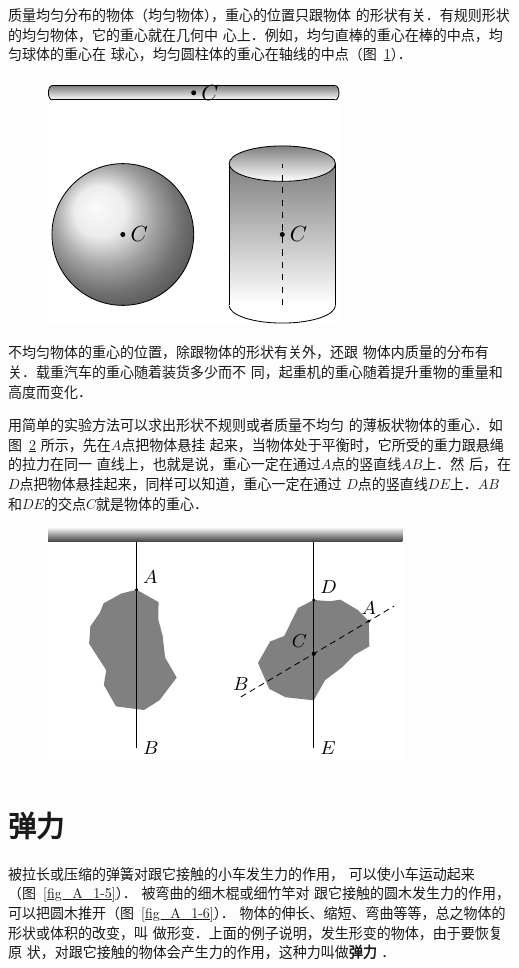     质量均匀分布的物体（均匀物体），重心的位置只跟物体
的形状有关．有规则形状的均匀物体，它的重心就在几何中
心上．例如，均匀直棒的重心在棒的中点，均匀球体的重心在
球心，均匀圆柱体的重心在轴线的中点（图~\ref{fig_A_1-3}）．

 \begin{figure} [htp]\centering
\includegraphics{fig/A/1-3.pdf} 
\caption{} \label{fig_A_1-3} 
 \end{figure} 

    不均匀物体的重心的位置，除跟物体的形状有关外，还跟
物体内质量的分布有关．载重汽车的重心随着装货多少而不
同，起重机的重心随着提升重物的重量和高度而变化．

    用简单的实验方法可以求出形状不规则或者质量不均匀
的薄板状物体的重心．如图~\ref{fig_A_1-4} 所示，先在$A$点把物体悬挂
起来，当物体处于平衡时，它所受的重力跟悬绳的拉力在同一
直线上，也就是说，重心一定在通过$A$点的竖直线$AB$上．然
后，在$D$点把物体悬挂起来，同样可以知道，重心一定在通过
$D$点的竖直线$DE$上．$AB$和$DE$的交点$C$就是物体的重心．


\begin{figure} [htp]
\centering
\includegraphics{fig/A/1-4.pdf} 
\caption{} \label{fig_A_1-4} 
\end{figure} 

\section{弹力} 
被拉长或压缩的弹簧对跟它接触的小车发生力的作用，
可以使小车运动起来（图~\ref{fig_A_1-5}）．
被弯曲的细木棍或细竹竿对
跟它接触的圆木发生力的作用，可以把圆木推开（图~\ref{fig_A_1-6}）．
物体的伸长、缩短、弯曲等等，总之物体的形状或体积的改变，叫
做形变．上面的例子说明，发生形变的物体，由于要恢复原
状，对跟它接触的物体会产生力的作用，这种力叫做\textbf{弹力} ．

